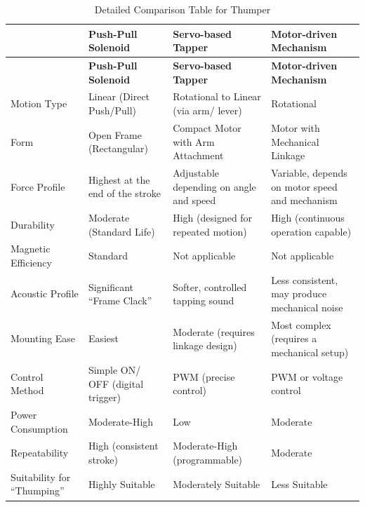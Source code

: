 \begin{thesisprose}
\FloatBarrier
\begingroup
\small
\setlength{\tabcolsep}{3pt}
\renewcommand{\arraystretch}{1.14}
\setlength{\arrayrulewidth}{1pt}
\begin{longtable}{|>{\raggedright\arraybackslash}p{}|>{\raggedright\arraybackslash}p{}|>{\raggedright\arraybackslash}p{}|>{\raggedright\arraybackslash}p{}|}
\caption{Detailed Comparison Table for Thumper}\label{tab:detailed-comparison-table-for-thumper-273}\\
\hline
{\bfseries \textbf{Features}} & {\bfseries \textbf{Push-Pull Solenoid}} & {\bfseries \textbf{Servo-based Tapper}} & {\bfseries \textbf{Motor-driven Mechanism}} \\
\hline
\endfirsthead
\hline
{\bfseries \textbf{Features}} & {\bfseries \textbf{Push-Pull Solenoid}} & {\bfseries \textbf{Servo-based Tapper}} & {\bfseries \textbf{Motor-driven Mechanism}} \\
\hline
\endhead
Motion Type & Linear (Direct Push/\allowbreak{}Pull) & Rotational to Linear (via arm/\allowbreak{} lever) & Rotational \\
\hline
Form & Open Frame (Rectangular) & Compact Motor with Arm Attachment & Motor with Mechanical Linkage \\
\hline
Force Profile & Highest at the end of the stroke & Adjustable depending on angle and speed & Variable, depends on motor speed and mechanism \\
\hline
Durability & Moderate (Standard Life) & High (designed for repeated motion) & High (continuous operation capable) \\
\hline
Magnetic Efficiency & Standard & Not applicable & Not applicable \\
\hline
Acoustic Profile & Significant “Frame Clack” & Softer, controlled tapping sound & Less consistent, may produce mechanical noise \\
\hline
Mounting Ease & Easiest & Moderate (requires linkage design) & Most complex (requires a mechanical setup) \\
\hline
Control Method & Simple ON/\allowbreak{} OFF (digital trigger) & PWM (precise control) & PWM or voltage control \\
\hline
Power Consumption & Moderate-High & Low & Moderate \\
\hline
Repeatability & High (consistent stroke) & Moderate-High (programmable) & Moderate \\
\hline
Suitability for “Thumping” & Highly Suitable & Moderately Suitable & Less Suitable \\
\hline
\end{longtable}
\endgroup


\end{thesisprose}
